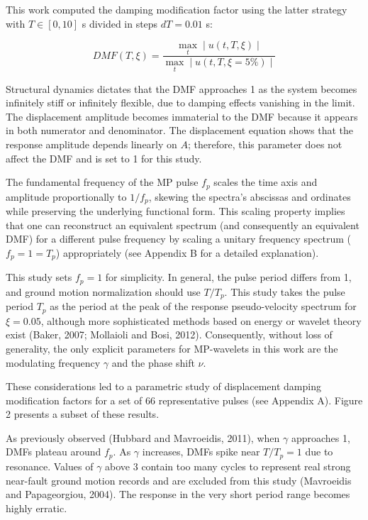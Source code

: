 This work computed the damping modification factor using the latter
strategy with \(T \in [0, 10]\) s divided in steps \(dT = 0.01\) s:

\[DMF(T, \xi) = \frac{\max_t \mid u(t,  T,  \xi) \mid}{\max_t \mid u(t,  T,  \xi = 5\%) \mid}\]

Structural dynamics dictates that the DMF approaches 1 as the system
becomes infinitely stiff or infinitely flexible, due to damping effects
vanishing in the limit. The displacement amplitude becomes immaterial to
the DMF because it appears in both numerator and denominator. The
displacement equation shows that the response amplitude depends linearly
on \(A\); therefore, this parameter does not affect the DMF and is set
to 1 for this study.

The fundamental frequency of the MP pulse \(f_p\) scales the time axis
and amplitude proportionally to \(1/f_p\), skewing the spectra's
abscissas and ordinates while preserving the underlying functional form.
This scaling property implies that one can reconstruct an equivalent
spectrum (and consequently an equivalent DMF) for a different pulse
frequency by scaling a unitary frequency spectrum (\(f_p = 1 = T_p\))
appropriately (see Appendix B for a detailed explanation).

This study sets \(f_p = 1\) for simplicity. In general, the pulse period
differs from 1, and ground motion normalization should use \(T/T_p\).
This study takes the pulse period \(T_p\) as the period at the peak of
the response pseudo-velocity spectrum for \(\xi = 0.05\), although more
sophisticated methods based on energy or wavelet theory exist (Baker,
2007; Mollaioli and Bosi, 2012). Consequently, without loss of
generality, the only explicit parameters for MP-wavelets in this work
are the modulating frequency \(\gamma\) and the phase shift \(\nu\).

These considerations led to a parametric study of displacement damping
modification factors for a set of 66 representative pulses (see Appendix
A). Figure 2 presents a subset of these results.

As previously observed (Hubbard and Mavroeidis, 2011), when \(\gamma\)
approaches 1, DMFs plateau around \(f_p\). As \(\gamma\) increases, DMFs
spike near \(T/T_p = 1\) due to resonance. Values of \(\gamma\) above 3
contain too many cycles to represent real strong near-fault ground
motion records and are excluded from this study (Mavroeidis and
Papageorgiou, 2004). The response in the very short period range becomes
highly erratic.

